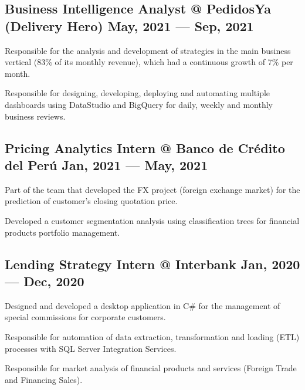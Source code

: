 \subsection{{Business Intelligence Analyst @ PedidosYa (Delivery Hero) \hfill May, 2021 --- Sep, 2021}}
\begin{zitemize}
\item Responsible for the analysis and development of strategies in the main business vertical  (83\% of its monthly revenue), which had a continuous growth of 7\% per month.
\item Responsible for designing, developing, deploying and automating multiple dashboards using DataStudio and BigQuery for daily, weekly and monthly business reviews.
\end{zitemize}

\subsection{{Pricing Analytics Intern @ Banco de Crédito del Perú \hfill Jan, 2021 --- May, 2021}}
\begin{zitemize}
\item Part of the team that developed the FX project (foreign exchange market) for the prediction of customer's closing quotation price.
\item Developed a customer segmentation analysis using classification trees for financial products portfolio management.
\end{zitemize}

\subsection{{Lending Strategy Intern @ Interbank \hfill Jan, 2020 --- Dec, 2020}}
\begin{zitemize}
\item Designed and developed a desktop application in C\# for the management of special commissions for corporate customers.
\item Responsible for automation of data extraction, transformation and loading (ETL) processes with SQL Server Integration Services.
\item Responsible for market analysis of financial products and services (Foreign Trade and Financing Sales).
\end{zitemize}
